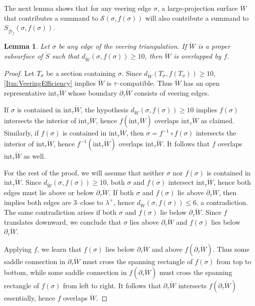 \documentclass[11pt,letterpaper]{amsart}
\newcommand{\mc}{\mathcal}
\newcommand{\mr}{\mathring}
\newcommand{\bdy}{\partial} %
\newcommand{\psub}{\mr W}
\numberwithin{equation}{section}
\newtheorem{lemma}[theorem]{Lemma}
\theoremstyle{definition}
\renewcommand{\int}{\mathrm{int}}
\begin{document}

The next lemma shows that for any veering edge $\sigma$, a large-projection surface $\psub$ that contributes a summand to $\mc S(\sigma, f(\sigma))$ will also contribute a summand to $S_{\mr{\mc D_f}}(\sigma, f(\sigma))$.

\begin{lemma}\label{Lem:LargeSigmaDistMeansOverlap}
Let $\sigma$ be any edge of the veering triangulation. If $\psub$ is a proper subsurface of $\mr S$ such that $d_{\psub}(\sigma, f(\sigma)) \geq 10$, then $\psub$ is overlapped by $f$.
\end{lemma}


\begin{proof}
Let $T_\sigma$ be a section containing $\sigma$. Since $d_{\psub}(T_\sigma, f(T_\sigma)) \geq 10$, 
 \eqref{Itm:VeeringEfficiency} implies  $\psub$ is $\tau$--compatible. Thus $\psub$ has an open representative $\int_\tau \psub$ whose boundary $\bdy_\tau \psub$ consists of veering edges.

If $\sigma$ is contained in $\int_\tau \psub$, the hypothesis $d_{\psub}(\sigma, f(\sigma)) \geq 10$ implies $f(\sigma)$ intersects the interior of $\int_\tau \psub$, hence $f(\int_\tau \psub)$ overlaps $\int_\tau \psub$ as claimed. Similarly, if $f(\sigma)$ is contained in  $\int_\tau \psub$, then $\sigma = f^{-1} \circ f(\sigma)$ intersects the interior of $\int_\tau \psub$, hence $f^{-1}(\int_\tau \psub)$ overlaps $\int_\tau \psub$. It follows that $f$ overlaps $\int_\tau \psub$ as well. 

For the rest of the proof, we will assume that neither $\sigma$ nor $f(\sigma)$ is contained in $\int_\tau \psub$. Since $d_{\psub}(\sigma, f(\sigma)) \geq 10$, both $\sigma$ and $f(\sigma)$ intersect $\int_\tau \psub$, hence both edges must lie above or below $\bdy_\tau \psub$. If both $\sigma$ and $f(\sigma)$ lie above $\bdy_\tau \psub$, then  implies both edges are $3$--close to $\lambda^+$, hence  $d_{\psub}(\sigma, f(\sigma)) \leq 6$, a contradiction. The same contradiction arises if both $\sigma$ and $f(\sigma)$ lie below $\bdy_\tau \psub$. Since $f$ translates downward, we conclude that $\sigma$ lies above $\bdy_\tau \psub$ and $f(\sigma)$ lies below $\bdy_\tau \psub$.

Applying $f$, we learn that $f(\sigma)$ lies below $\bdy_\tau \psub$ and above $f(\bdy_\tau \psub)$. Thus some saddle connection in $\bdy_\tau \psub$ must cross the spanning rectangle of $f(\sigma)$ from top to bottom, while some saddle connection in $f(\bdy_\tau \psub)$ must cross the spanning rectangle of $f(\sigma)$ from left to right. It follows that  $\bdy_\tau \psub$ intersects $f(\bdy_\tau \psub)$ essentially, hence $f$ overlaps $\psub$.
\end{proof}
\end{document}
